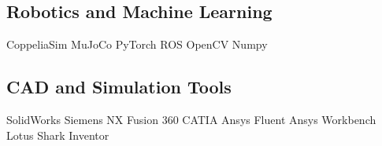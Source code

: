 \documentclass[]{deedy-resume-openfont}
\begin{document}
\begin{minipage}[t]{0.33\textwidth}
\subsection{Robotics and Machine Learning}
CoppeliaSim \textbullet{} MuJoCo \textbullet{} PyTorch\textbullet{}  ROS \textbullet{} OpenCV \textbullet{} Numpy 
\subsection{CAD and Simulation Tools}
SolidWorks \textbullet{} Siemens NX \textbullet{} Fusion 360 \textbullet{} 
CATIA \textbullet{} Ansys Fluent \textbullet{} Ansys Workbench \textbullet{} Lotus Shark \textbullet{} Inventor
%
%

\end{minipage} 
\hfill
\end{document}
